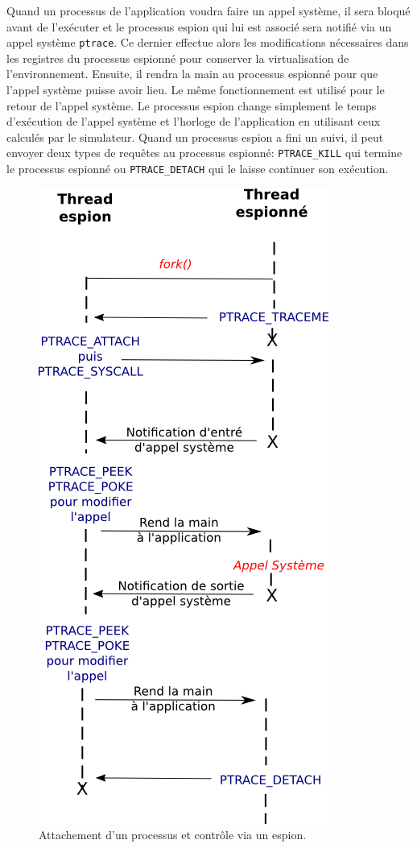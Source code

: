 Quand un processus de l'application voudra faire un appel système, il sera
bloqué avant de l'exécuter et le processus espion qui lui est associé sera
notifié via un appel système \texttt{ptrace}. Ce dernier effectue alors les
modifications nécessaires dans les registres du processus espionné pour
conserver la virtualisation de l'environnement. Ensuite, il rendra la main au
processus espionné pour que l'appel système puisse avoir lieu. Le même
fonctionnement est utilisé pour le retour de l'appel système. Le processus
espion change simplement le temps d'exécution de l'appel système et l'horloge de
l'application en utilisant ceux calculés par le simulateur. Quand un processus
espion a fini un suivi, il peut envoyer deux types de requêtes au processus
espionné: \texttt{PTRACE\_KILL} qui termine le processus espionné
ou \texttt{PTRACE\_DETACH} qui le laisse continuer son exécution.

\begin{figure}
\centering
\includegraphics[scale=0.5]{Pictures/png/ptrace_fonctionnement}
\caption{Attachement d'un processus et contrôle via un espion.}
\label{PTRACE_FONCTIONNEMENT}
\end{figure}

